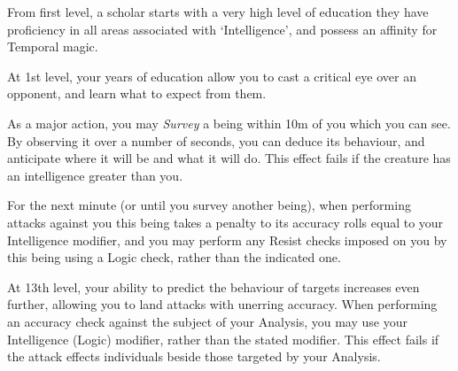 {
From first level, a scholar starts with a very high level of education \minus{} they have proficiency in all areas associated with `Intelligence', and possess an affinity for Temporal magic. 
}

{
At 1st level, your years of education allow you to cast a critical eye over an opponent, and learn what to expect from them. 

As a major action, you may {\it Survey} a being within 10m of you which you can see. By observing it over a number of seconds, you can deduce its behaviour, and anticipate where it will be and what it will do. This effect fails if the creature has an intelligence greater than you. 

For the next minute (or until you survey another being), when performing attacks against you this being takes a penalty to its accuracy rolls equal to your Intelligence modifier, and you may perform any Resist checks imposed on you by this being using a Logic check, rather than the indicated one. 


At 13th level, your ability to predict the behaviour of targets increases even further, allowing you to land attacks with unerring accuracy. When performing an accuracy check against the subject of your Analysis, you may use your Intelligence (Logic) modifier, rather than the stated modifier. This effect fails if the attack effects individuals beside those targeted by your Analysis. 
}

